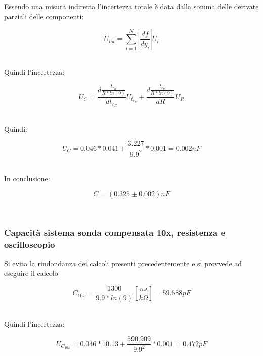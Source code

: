 \documentclass[a4paper]{article}
\begin{document}
Essendo una misura indiretta l'incertezza totale è data dalla somma delle derivate parziali delle componenti:
\begin{Large}
	\begin{equation}
		U_{tot}=\sum_{i=1}^{N}|{\frac{df}{dy_i}}| U_i
	\end{equation}
\end{Large}\\

Quindi l'incertezza:
\begin{Large}
	\begin{equation}
		{U_C}= \frac{d\frac{t_{r_R}}{R*ln(9)}}{dt_{r_R}}U_{t_{r_R}}+\frac{d\frac{t_{r_R}}{R*ln(9)}}{dR}U_{R}
	\end{equation}
\end{Large}\\

Quindi:
\begin{Large}
	\begin{equation}
		{U_C}= 0.046*0.041+\frac{3.227}{9.9^2}*0.001=0.002 nF
	\end{equation}
\end{Large}\\

In conclusione: 
\begin{Large}
	\begin{equation}
		C=(0.325\pm 0.002)nF
	\end{equation}
\end{Large}\\

\subsubsection{Capacità sistema sonda compensata 10x, resistenza e oscilloscopio }
Si evita la rindondanza dei calcoli presenti precedentemente e si provvede ad eseguire il calcolo
\begin{Large}
	\begin{equation}
  		C_{10x}= \frac{1300}{9.9*ln(9)} [\frac{ns}{k\Omega}]= 59.688pF
	\end{equation}
\end{Large}\\

Quindi l'incertezza:
\begin{Large}
	\begin{equation}
		{U_{C_{10x}}}= 0.046*10.13+\frac{590.909}{9.9^2}*0.001=0.472 pF
	\end{equation}
\end{Large}\\
\end{document}
